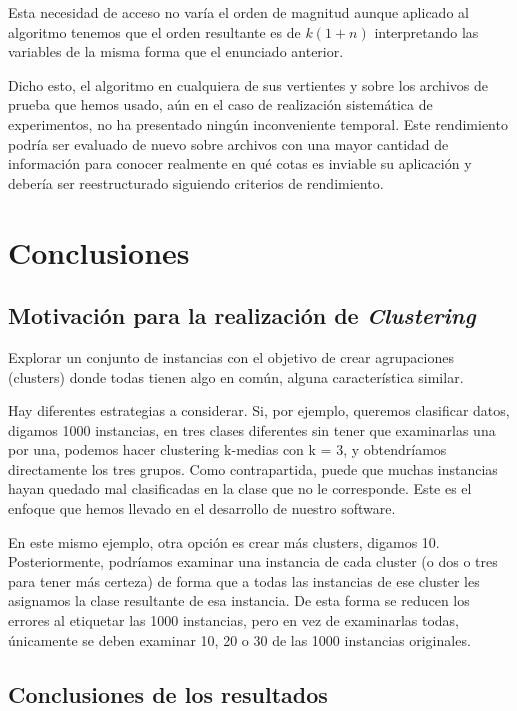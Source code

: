 \documentclass[a4paper]{report}
\begin{document}
	Esta necesidad de acceso no varía el orden de magnitud aunque aplicado al algoritmo tenemos que el orden resultante es de $k(1+n)$ interpretando las variables de la misma forma que el enunciado anterior.
	
	Dicho esto, el algoritmo en cualquiera de sus vertientes y sobre los archivos de prueba que hemos usado, aún en el caso de realización sistemática de experimentos, no ha presentado ningún inconveniente temporal. Este rendimiento podría ser evaluado de nuevo sobre archivos con una mayor cantidad de información para conocer realmente en qué cotas es inviable su aplicación y debería ser reestructurado siguiendo criterios de rendimiento.

\chapter{Conclusiones}

\section{Motivación para la realización de \textit{Clustering}}

Explorar un conjunto de instancias con el objetivo de crear agrupaciones (clusters) donde todas tienen algo en común, alguna característica similar.

Hay diferentes estrategias a considerar. Si, por ejemplo, queremos clasificar datos, digamos 1000 instancias, en tres clases diferentes sin tener que examinarlas una por una, podemos hacer clustering k-medias con k = 3, y obtendríamos directamente los tres grupos. Como contrapartida, puede que muchas instancias hayan quedado mal clasificadas en la clase que no le corresponde. Este es el enfoque que hemos llevado en el desarrollo de nuestro software.

En este mismo ejemplo, otra opción es crear más clusters, digamos 10. Posteriormente, podríamos examinar una instancia de cada cluster (o dos o tres para tener más certeza) de forma  que a todas las instancias de ese cluster les asignamos la clase resultante de esa instancia. De esta forma se reducen los errores al etiquetar las 1000 instancias, pero en vez de examinarlas todas, únicamente se deben examinar 10, 20 o 30 de las 1000 instancias originales.

\section{Conclusiones de los resultados}
\end{document}
